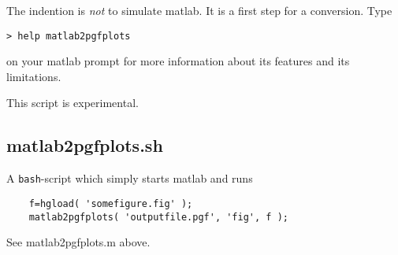 The indention is \emph{not} to simulate matlab. It is a first step for a conversion. Type
\begin{lstlisting}
> help matlab2pgfplots
\end{lstlisting}
on your matlab prompt for more information about its features and its limitations.

This script is experimental.

\subsection{matlab2pgfplots.sh}
A \texttt{bash}-script which simply starts matlab and runs 
\begin{lstlisting}
	f=hgload( 'somefigure.fig' );
	matlab2pgfplots( 'outputfile.pgf', 'fig', f );
\end{lstlisting}
See matlab2pgfplots.m above.

